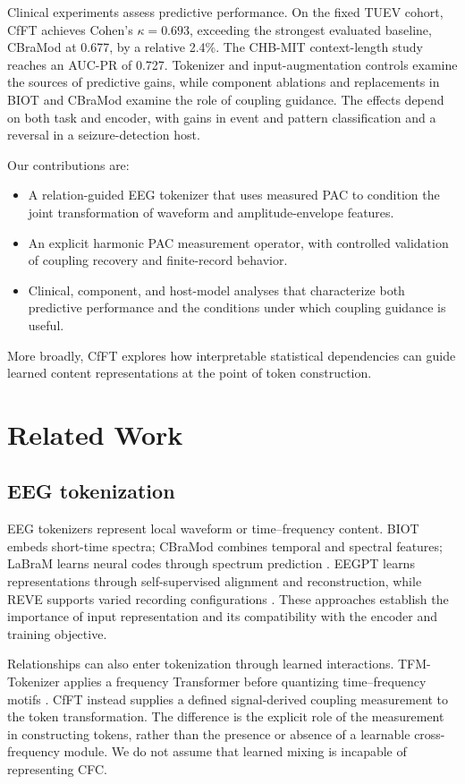 \documentclass[10pt,twocolumn,letterpaper]{article}
\begin{document}
Clinical experiments assess predictive performance. On the fixed TUEV
cohort, CfFT achieves
Cohen's $\kappa=0.693$, exceeding the strongest evaluated baseline,
CBraMod at 0.677, by a relative 2.4\%. The CHB-MIT context-length study
reaches an AUC-PR of 0.727. Tokenizer and input-augmentation controls
examine the sources of predictive gains, while component ablations
and replacements in BIOT and CBraMod examine the role of coupling
guidance. The effects depend on both task and encoder, with gains in
event and pattern classification and a reversal in a seizure-detection
host.

Our contributions are:
\begin{itemize}[leftmargin=*,itemsep=1pt,topsep=2pt]
\item A relation-guided EEG tokenizer that uses measured PAC to condition
the joint transformation of waveform and amplitude-envelope features.
\item An explicit harmonic PAC measurement operator, with controlled
validation of coupling recovery and finite-record behavior.
\item Clinical, component, and host-model analyses that characterize
both predictive performance and the conditions under which coupling
guidance is useful.
\end{itemize}
More broadly, CfFT explores how interpretable statistical dependencies
can guide learned content representations at the point of token
construction.

\section{Related Work}
\label{sec:related}
\subsection{EEG tokenization}
EEG tokenizers represent local waveform or time--frequency content.
BIOT embeds short-time spectra; CBraMod combines temporal and spectral
features; LaBraM learns neural codes through spectrum prediction
\citep{yang2023biot,wang2025cbramod,jiang2024labram}.
EEGPT learns representations through self-supervised alignment and
reconstruction, while REVE supports varied recording configurations
\citep{wang2024eegpt,elouahidi2025reve}.
These approaches establish the importance of input representation and
its compatibility with the encoder and training objective.

Relationships can also enter tokenization through learned interactions.
TFM-Tokenizer applies a frequency Transformer before quantizing
time--frequency motifs \citep{pradeepkumar2026tfm}.
CfFT instead supplies a defined signal-derived coupling measurement to
the token transformation. The difference is the explicit role of the
measurement in constructing tokens, rather than the presence or absence
of a learnable cross-frequency module. We do not assume that learned
mixing is incapable of representing CFC.
\end{document}
